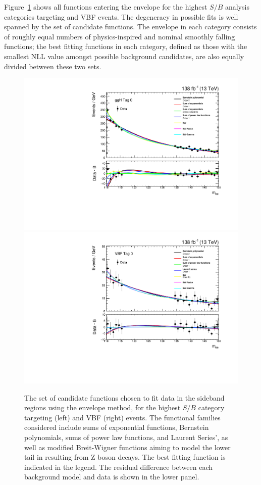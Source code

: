 Figure~\ref{fig:hee_bmodels} shows all functions entering the envelope for the highest $S/B$ analysis categories targeting \ggH and VBF events. The degeneracy in possible fits is well spanned by the set of candidate functions. The envelope in each category consists of roughly equal numbers of physics-inspired and nominal smoothly falling functions; the best fitting functions in each category, defined as those with the smallest NLL value amongst possible background candidates, are also equally divided between these two sets.

\begin{figure}[htbp!]
\centering
\includegraphics[trim={0cm 3.5cm 0cm 0cm},clip,width =0.495\linewidth]{Figures/Hee/Results/bkgModels/bmodel_gghcat0.pdf}
\includegraphics[trim={0cm 3.5cm 0cm 0cm},clip,width =0.495\linewidth]{Figures/Hee/Results/bkgModels/bmodel_vbfcat0.pdf}
\caption[The set of candidate background functions for the \ggH Tag 0 and VBF Tag 0 analysis categories.]{The set of candidate functions chosen to fit data in the \mee sideband regions using the envelope method, for the highest $S/B$ category targeting \ggH (left) and VBF (right) events. The functional families considered include sums of exponential functions, Bernstein polynomials, sums of power law functions, and Laurent Series', as well as modified Breit-Wigner functions aiming to model the lower tail in \mee resulting from $\mathrm{Z}$ boson decays. The best fitting function is indicated in the legend. The residual difference between each background model and data is shown in the lower panel. }
\label{fig:hee_bmodels}
\end{figure}


